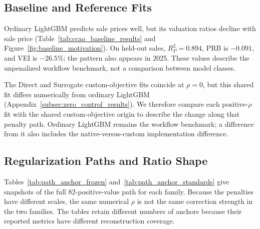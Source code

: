 \documentclass[10pt]{article}
\theoremstyle{definition}
\newcommand{\1}{\mathbf{1}}
\begin{document}
\subsection{Baseline and Reference Fits}
\label{subsec:ccao_baseline_results}
\label{subsec:zero_reference_result}

Ordinary LightGBM predicts sale prices well, but its valuation ratios decline with sale price (Table~\ref{tab:ccao_baseline_results} and Figure~\ref{fig:baseline_motivation}). On held-out sales, $R^2_P=0.894$, PRB is $-0.091$, and VEI is $-26.5\%$; the pattern also appears in 2025. These values describe the unpenalized workflow benchmark, not a comparison between model classes.

The Direct and Surrogate custom-objective fits coincide at $\rho=0$, but this shared fit differs numerically from ordinary LightGBM (Appendix~\ref{subsec:zero_control_results}). We therefore compare each positive-$\rho$ fit with the shared custom-objective origin to describe the change along that penalty path. Ordinary LightGBM remains the workflow benchmark; a difference from it also includes the native-versus-custom implementation difference.

\subsection{Regularization Paths and Ratio Shape}
\label{subsec:path_results}

Tables~\ref{tab:path_anchor_frozen} and~\ref{tab:path_anchor_standards} give snapshots of the full 82-positive-value path for each family. Because the penalties have different scales, the same numerical $\rho$ is not the same correction strength in the two families. The tables retain different numbers of anchors because their reported metrics have different reconstruction coverage.
\end{document}

